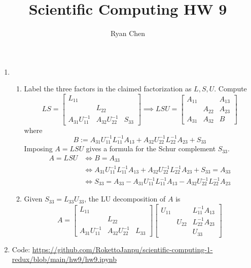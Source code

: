 \documentclass{article}
\title{Scientific Computing HW 9}
\author{Ryan Chen}
\newcommand{\m}[2][b]{\begin{#1matrix}#2\end{#1matrix}}
\newcommand{\inv}{^{-1}}
\newcommand{\imp}{\implies}
\begin{document}
	
\maketitle
	


\begin{enumerate}
	
	
	
	\item 
	
	\begin{enumerate}
		
		
		
		\item Label the three factors in the claimed factorization as $L,S,U$. Compute
		\[LS = \m{L_{11} & & \\ & L_{22} & \\ A_{31}U_{11}\inv & A_{32}U_{22}\inv & S_{33}}
		\imp LSU = \m{A_{11} & & A_{13} \\ & A_{22} & A_{23} \\ A_{31} & A_{32} & B}\]
		where
		\[B := A_{31}U_{11}\inv L_{11}\inv A_{13} + A_{32}U_{22}\inv L_{22}\inv A_{23} + S_{33}\]
		Imposing $A=LSU$ gives a formula for the Schur complement $S_{33}$.
		\begin{align*}
			A = LSU
			&\iff B = A_{33} \\
			&\iff A_{31}U_{11}\inv L_{11}\inv A_{13} + A_{32} U_{22}\inv L_{22}\inv A_{23} + S_{33} = A_{33} \\
			&\iff S_{33} = A_{33} - A_{31}U_{11}\inv L_{11}\inv A_{13} - A_{32} U_{22}\inv L_{22}\inv A_{23}
		\end{align*}

		
	
	
		\item Given $S_{33}=L_{33}U_{33}$, the LU decomposition of $A$ is
		\[A = \m{L_{11} & & \\ & L_{22} & \\ A_{31}U_{11}\inv & A_{32}U_{22}\inv & L_{33}}
			  \m{U_{11} & & L_{11}\inv A_{13} \\ & U_{22} & L_{22}\inv A_{23} \\ & & U_{33}}\]
		
		
		
	\end{enumerate}



	\pagebreak
	
	
	
	\item Code: \url{https://github.com/RokettoJanpu/scientific-computing-1-redux/blob/main/hw9/hw9.ipynb}
	

\end{enumerate}
\end{document}
